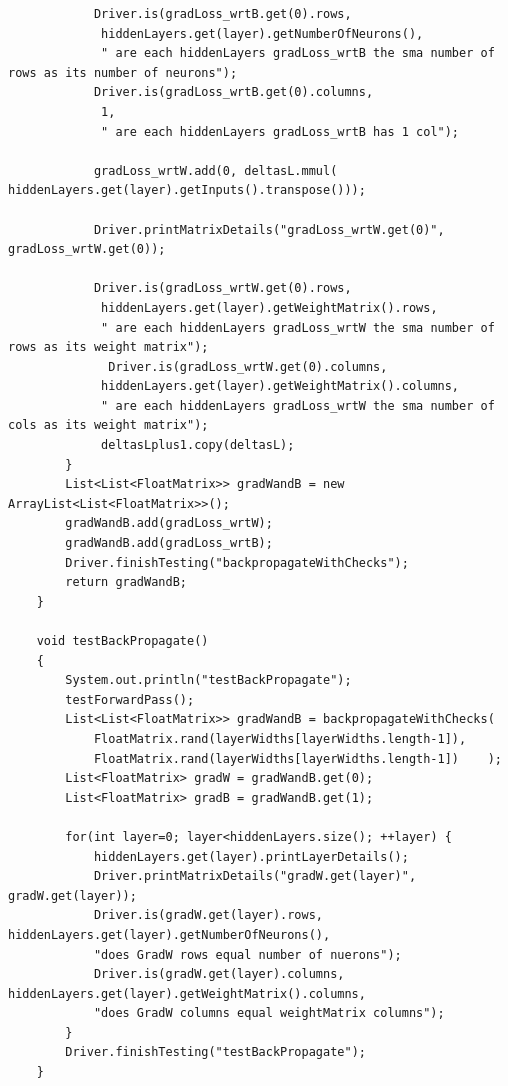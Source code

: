 \documentclass[11pt]{article} %
\begin{document}
\begin{lstlisting}
            Driver.is(gradLoss_wrtB.get(0).rows,
             hiddenLayers.get(layer).getNumberOfNeurons(),
             " are each hiddenLayers gradLoss_wrtB the sma number of rows as its number of neurons");
            Driver.is(gradLoss_wrtB.get(0).columns,
             1,
             " are each hiddenLayers gradLoss_wrtB has 1 col");
            
            gradLoss_wrtW.add(0, deltasL.mmul( hiddenLayers.get(layer).getInputs().transpose()));
            
            Driver.printMatrixDetails("gradLoss_wrtW.get(0)", gradLoss_wrtW.get(0));

            Driver.is(gradLoss_wrtW.get(0).rows,
             hiddenLayers.get(layer).getWeightMatrix().rows,
             " are each hiddenLayers gradLoss_wrtW the sma number of rows as its weight matrix");
              Driver.is(gradLoss_wrtW.get(0).columns,
             hiddenLayers.get(layer).getWeightMatrix().columns,
             " are each hiddenLayers gradLoss_wrtW the sma number of cols as its weight matrix");
             deltasLplus1.copy(deltasL);
        }
        List<List<FloatMatrix>> gradWandB = new ArrayList<List<FloatMatrix>>();
        gradWandB.add(gradLoss_wrtW);
        gradWandB.add(gradLoss_wrtB);
        Driver.finishTesting("backpropagateWithChecks");
        return gradWandB;
    }
    
    void testBackPropagate()
    {
        System.out.println("testBackPropagate");
        testForwardPass();
        List<List<FloatMatrix>> gradWandB = backpropagateWithChecks(
            FloatMatrix.rand(layerWidths[layerWidths.length-1]),
            FloatMatrix.rand(layerWidths[layerWidths.length-1])    );
        List<FloatMatrix> gradW = gradWandB.get(0);
        List<FloatMatrix> gradB = gradWandB.get(1);

        for(int layer=0; layer<hiddenLayers.size(); ++layer) {
            hiddenLayers.get(layer).printLayerDetails();
            Driver.printMatrixDetails("gradW.get(layer)", gradW.get(layer));
            Driver.is(gradW.get(layer).rows, hiddenLayers.get(layer).getNumberOfNeurons(),
            "does GradW rows equal number of nuerons");
            Driver.is(gradW.get(layer).columns, hiddenLayers.get(layer).getWeightMatrix().columns,
            "does GradW columns equal weightMatrix columns");
        }
        Driver.finishTesting("testBackPropagate");
    }
\end{lstlisting}
\end{document}
